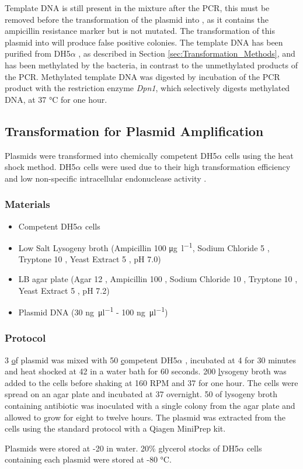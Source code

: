 Template DNA is still present in the mixture after the PCR, this must be removed before the transformation of the plasmid into \ecoli, as it contains the ampicillin resistance marker but is not mutated. The transformation of this plasmid into \ecoli will produce false positive colonies. The template DNA has been purified from DH5$\alpha$ \ecoli, as described in Section \ref{sec:Transformation_Methods}, and has been methylated by the bacteria, in contrast to the unmethylated products of the PCR. Methylated template DNA was digested by incubation of the PCR product with the restriction enzyme \textit{Dpn1}, which selectively digests methylated DNA, at 37 \si{\degreeCelsius} for one hour. 
		\newpage

		\subsection*{Transformation for Plasmid Amplification}
		\label{sec:Transformation_Methods}
		Plasmids were transformed into chemically competent DH5$\alpha$ \ecoli cells using the heat shock method. DH5$\alpha$ cells were used due to their high transformation efficiency and low non-specific intracellular endonuclease activity \cite{BRL1986}.
			\subsubsection{Materials}
			\begin{itemize}
			\item Competent DH5$\alpha$ \ecoli cells
			\item Low Salt Lysogeny broth (Ampicillin 100 \si{\micro\gram\per\litre}, Sodium Chloride 5 \gl, Tryptone 10 \gl, Yeast Extract 5 \gl, pH 7.0)
			\item LB agar plate (Agar 12 \gl , Ampicillin 100 \ugl , Sodium Chloride 10 \gl , Tryptone 10 \gl , Yeast Extract 5 \gl, pH 7.2)
			\item Plasmid DNA (30 \si{\nano\gram\per\micro\litre} - 100 \si{\nano\gram\per\micro\litre})
			\end{itemize}
			
			\subsubsection{Protocol}
		
			3 \ul of plasmid was mixed with 50 \ul competent DH5$\alpha$ \ecoli, incubated at 4 \degrees for 30 minutes and heat shocked at 42 \degrees in a water bath for 60 seconds. 200 \ul lysogeny broth was added to the cells before shaking at 160 RPM and 37 \degrees for one hour. The cells were spread on an agar plate and incubated at 37 \degrees overnight. 50 \ml of lysogeny broth containing antibiotic was inoculated with a single colony from the agar plate and allowed to grow for eight to twelve hours. The plasmid was extracted from the cells using the standard protocol with a Qiagen MiniPrep kit. 
\par		
Plasmids were stored at -20 \degrees in water. 20\% glycerol stocks of DH5$\alpha$ cells containing each plasmid were stored at -80 \si{\degreeCelsius}.  
		 
